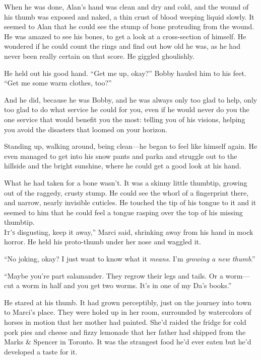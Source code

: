 \documentclass{article}
\begin{document}
When he was done, Alan's hand was clean and dry and cold, and the
wound of his thumb was exposed and naked, a thin crust of blood
weeping liquid slowly.  It seemed to Alan that he could see the stump
of bone protruding from the wound.  He was amazed to see his bones, to
get a look at a cross-section of himself.  He wondered if he could
count the rings and find out how old he was, as he had never been
really certain on that score.  He giggled ghoulishly.

He held out his good hand.  ``Get me up, okay?'' Bobby hauled him to
his feet.  ``Get me some warm clothes, too?''

And he did, because he was Bobby, and he was always only too glad to
help, only too glad to do what service he could for you, even if he
would never do you the one service that would benefit you the most: 
telling you of his visions, helping you avoid the disasters that
loomed on your horizon.

Standing up, walking around, being clean---he began to feel like
himself again.  He even managed to get into his snow pants and parka
and struggle out to the hillside and the bright sunshine, where he
could get a good look at his hand.

What he had taken for a bone wasn't.  It was a skinny little thumbtip,
growing out of the raggedy, crusty stump.  He could see the whorl of a
fingerprint there, and narrow, nearly invisible cuticles.  He touched
the tip of his tongue to it and it seemed to him that he could feel a
tongue rasping over the top of his missing thumbtip.
\\
\lettrine[lines=3, lhang=.5, nindent=0pt, findent=2pt]{I}{t's} disgusting, keep it away,'' Marci said, shrinking away from his
hand in mock horror.  He held his proto-thumb under her nose and
waggled it.

``No joking, okay?  I just want to know what it \textit{means}.  I'm
\textit{growing a new thumb}.''

``Maybe you're part salamander.  They regrow their legs and tails.  Or
a worm---cut a worm in half and you get two worms.  It's in one of my
Da's books.''

He stared at his thumb.  It had grown perceptibly, just on the journey
into town to Marci's place.  They were holed up in her room,
surrounded by watercolors of horses in motion that her mother had
painted.  She'd raided the fridge for cold pork pies and cheese and
fizzy lemonade that her father had shipped from the Marks \&
Spencer in Toronto.  It was the strangest food he'd ever eaten but
he'd developed a taste for it.
\end{document}
